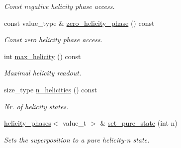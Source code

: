 \begin{DoxyCompactItemize}
\begin{DoxyCompactList}\small\item\em Const negative helicity phase access. \end{DoxyCompactList}\item 
\hypertarget{a00271_aebd313e8a517e88ed886d97fc795c97e}{const value\-\_\-type \& \hyperlink{a00271_aebd313e8a517e88ed886d97fc795c97e}{zero\-\_\-helicity\-\_\-phase} () const }\label{a00271_aebd313e8a517e88ed886d97fc795c97e}

\begin{DoxyCompactList}\small\item\em Const zero helicity phase access. \end{DoxyCompactList}\item 
\hypertarget{a00271_a973c81eba8f08e6646a80f41ae0da6c8}{int \hyperlink{a00271_a973c81eba8f08e6646a80f41ae0da6c8}{max\-\_\-helicity} () const }\label{a00271_a973c81eba8f08e6646a80f41ae0da6c8}

\begin{DoxyCompactList}\small\item\em Maximal helicity readout. \end{DoxyCompactList}\item 
\hypertarget{a00271_a8dbf49ceb87326a0428fd97b72b6a321}{size\-\_\-type \hyperlink{a00271_a8dbf49ceb87326a0428fd97b72b6a321}{n\-\_\-helicities} () const }\label{a00271_a8dbf49ceb87326a0428fd97b72b6a321}

\begin{DoxyCompactList}\small\item\em Nr. of helicity states. \end{DoxyCompactList}\item 
\hypertarget{a00271_a17058c9650fd8be8a7f8296d13a16a17}{\hyperlink{a00271}{helicity\-\_\-phases}$<$ value\-\_\-t $>$ \& \hyperlink{a00271_a17058c9650fd8be8a7f8296d13a16a17}{set\-\_\-pure\-\_\-state} (int n)}\label{a00271_a17058c9650fd8be8a7f8296d13a16a17}

\begin{DoxyCompactList}\small\item\em Sets the superposition to a pure helicity-\/n state. \end{DoxyCompactList}\end{DoxyCompactItemize}
